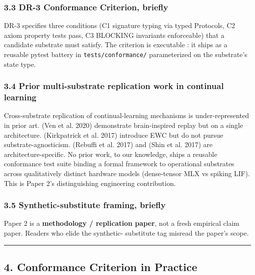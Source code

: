\documentclass[
]{article}
\begin{document}
\subsubsection{3.3 DR-3 Conformance Criterion,
briefly}\label{dr-3-conformance-criterion-briefly}

DR-3 specifies three conditions (C1 signature typing via typed
Protocols, C2 axiom property tests pass, C3 BLOCKING invariants
enforceable) that a candidate substrate must satisfy. The criterion is
executable : it ships as a reusable pytest battery in
\texttt{tests/conformance/} parameterized on the substrate's state type.

\subsubsection{3.4 Prior multi-substrate replication work in continual
learning}\label{prior-multi-substrate-replication-work-in-continual-learning}

Cross-substrate replication of continual-learning mechanisms is
under-represented in prior art. (Ven et al. 2020) demonstrate
brain-inspired replay but on a single architecture. ({Kirkpatrick et
al.} 2017) introduce EWC but do not pursue substrate-agnosticism.
(Rebuffi et al. 2017) and (Shin et al. 2017) are architecture-specific.
No prior work, to our knowledge, ships a reusable conformance test suite
binding a formal framework to operational substrates across
qualitatively distinct hardware models (dense-tensor MLX vs spiking
LIF). This is Paper 2's distinguishing engineering contribution.

\subsubsection{3.5 Synthetic-substitute framing,
briefly}\label{synthetic-substitute-framing-briefly}

Paper 2 is a \textbf{methodology / replication paper}, not a fresh
empirical claim paper. Readers who elide the synthetic- substitute tag
misread the paper's scope.

\begin{center}\rule{0.5\linewidth}{0.5pt}\end{center}

\subsection{4. Conformance Criterion in
Practice}\label{conformance-criterion-in-practice}
\end{document}
